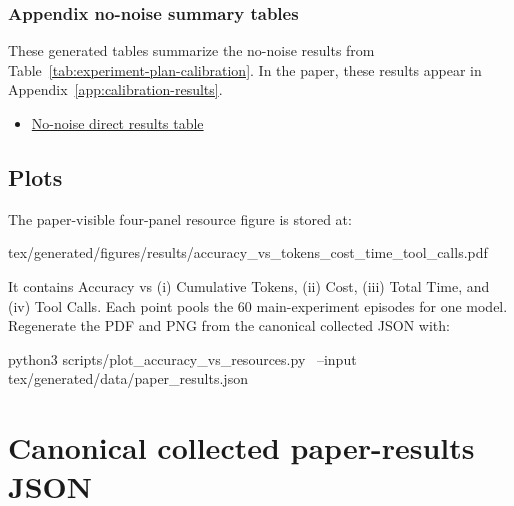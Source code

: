 \documentclass[11pt]{article}
\begin{document}
\subsubsection*{Appendix no-noise summary tables}
These generated tables summarize the no-noise results from Table~\ref{tab:experiment-plan-calibration}.
In the paper, these results appear in Appendix~\ref{app:calibration-results}.
\begin{itemize}
  \item \hyperref[tab:app-calibration-frost-01234-anchor]{No-noise direct results table}
\end{itemize}


\subsection{Plots}
The paper-visible four-panel resource figure is stored at:
\begin{DocCode}
tex/generated/figures/results/accuracy_vs_tokens_cost_time_tool_calls.pdf
\end{DocCode}
It contains Accuracy vs (i) Cumulative Tokens, (ii) Cost, (iii) Total Time, and (iv) Tool Calls.
Each point pools the 60 main-experiment episodes for one model.
Regenerate the PDF and PNG from the canonical collected JSON with:
\begin{DocCode}
python3 scripts/plot_accuracy_vs_resources.py \
  --input tex/generated/data/paper_results.json
\end{DocCode}



\FloatBarrier
\appendix
\section{Canonical collected paper-results JSON}
\label{sec:experiment-plan-canonical-paper-results-json}
\end{document}
